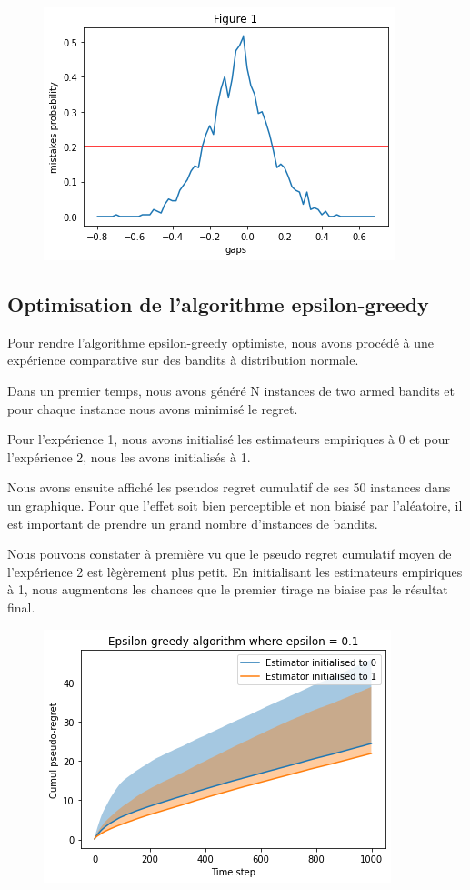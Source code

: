 \documentclass[letterpaper,11pt]{article}
\begin{document}
\begin{figure}[H]
\label{fig: no1_1}
\begin{center}
\includegraphics[scale=0.8]{fig1_no1_1.png} 
\end{center}
\end{figure}


\subsection{Optimisation de l'algorithme epsilon-greedy}
Pour rendre l'algorithme epsilon-greedy optimiste, nous avons procédé à une expérience comparative sur des bandits à distribution normale.

Dans un premier temps, nous avons généré N instances de two armed bandits et pour chaque instance nous avons minimisé le regret.

Pour l'expérience 1, nous avons initialisé les estimateurs empiriques à 0 et pour l'expérience 2, nous les avons initialisés à 1.

Nous avons ensuite affiché les pseudos regret cumulatif de ses 50 instances dans un graphique.
Pour que l'effet soit bien perceptible et non biaisé par l'aléatoire, il est important de prendre un grand nombre d'instances de bandits.

Nous pouvons constater à première vu que le pseudo regret cumulatif moyen de l'expérience 2 est lègèrement plus petit.
En initialisant les estimateurs empiriques à 1, nous augmentons les chances que le premier tirage ne biaise pas le résultat final.


\begin{figure}[H]
\label{fig: no1_2}
\begin{center}
\includegraphics[scale=0.8]{fig2_no1_2.png} 
\end{center}
\end{figure}
\end{document}
